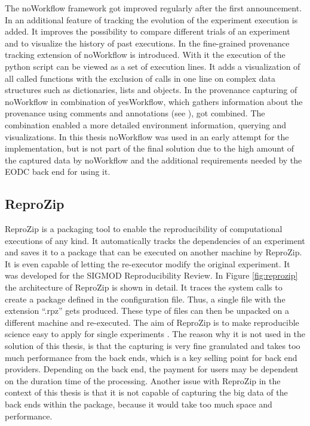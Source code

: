 \documentclass[draft,final]{vutinfth} %
\begin{document}
The noWorkflow framework got improved regularly after the first announcement. In \cite{Pimentel2016TrackingAA} an additional feature of tracking the evolution of the experiment execution is added. It improves the possibility to compare different trials of an experiment and to visualize the history of past executions. In \cite{Pimentel:2016:FPC:3090188.3090214} the fine-grained provenance tracking extension of noWorkflow is introduced. With it the execution of the python script can be viewed as a set of execution lines. It adds a visualization of all called functions with the exclusion of calls in one line on complex data structures such as dictionaries, lists and objects. In \cite{69bac1252a684629baa43b48e350068d} the provenance capturing of noWorkflow in combination of yesWorkflow, which gathers information about the provenance using comments and annotations (see \cite{192094}), got combined. The combination enabled a more detailed environment information, querying and visualizations. 
In this thesis noWorkflow was used in an early attempt for the implementation, but is not part of the final solution due to the high amount of the captured data by noWorkflow and the additional requirements needed by the EODC back end for using it.

\subsection{ReproZip}\label{ReproZip}
ReproZip is a packaging tool to enable the reproducibility of computational executions of any kind. It automatically tracks the dependencies of an experiment and saves it to a package that can be executed on another machine by ReproZip. It is even capable of letting the re-executor modify the original experiment. It was developed for the SIGMOD Reproducibility Review. In Figure \ref{fig:reprozip} the architecture of ReproZip is shown in detail. It traces the system calls to create a package defined in the configuration file. Thus, a single file with the extension “.rpz” gets produced. These type of files can then be unpacked on a different machine and re-executed. The aim of ReproZip is to make reproducible science easy to apply for single experiments \cite{29c5846926a4497d95f276604cb0368c}. The reason why it is not used in the solution of this thesis, is that the capturing is very fine granulated and takes too much performance from the back ends, which is a key selling point for back end providers. Depending on the back end, the payment for users may be dependent on the duration time of the processing. Another issue with ReproZip in the context of this thesis is that it is not capable of capturing the big data of the back ends within the package, because it would take too much space and performance.  
\end{document}
